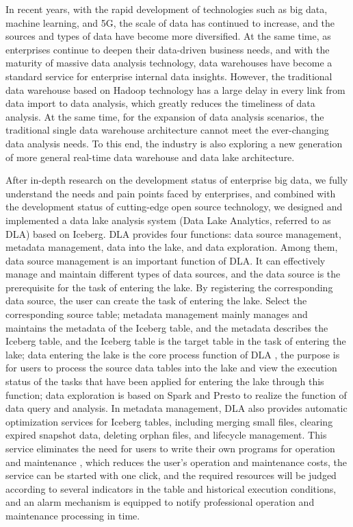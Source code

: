 \begin{abstract*}

In recent years, with the rapid development of technologies such as big data,
machine learning, and 5G, the scale of data has continued to increase, and the
sources and types of data have become more diversified. At the same time, as
enterprises continue to deepen their data-driven business needs, and with the
maturity of massive data analysis technology, data warehouses have become a
standard service for enterprise internal data insights. However, the traditional
data warehouse based on Hadoop technology has a large delay in every link from data
import to data analysis, which greatly reduces the timeliness of data analysis.
At the same time, for the expansion of data analysis scenarios, the traditional
single data warehouse architecture cannot meet the ever-changing data analysis
needs. To this end, the industry is also exploring a new generation of more general
real-time data warehouse and data lake architecture.

After in-depth research on the development status of enterprise big data, we fully
understand the needs and pain points faced by enterprises, and combined with the
development status of cutting-edge open source technology, we designed and implemented
a data lake analysis system (Data Lake Analytics, referred to as DLA) based on Iceberg.
DLA provides four functions: data source management, metadata management, data into the
lake, and data exploration. Among them, data source management is an important function
of DLA. It can effectively manage and maintain different types of data sources, and the
data source is the prerequisite for the task of entering the lake. By registering the
corresponding data source, the user can create the task of entering the lake. Select
the corresponding source table; metadata management mainly manages and maintains the
metadata of the Iceberg table, and the metadata describes the Iceberg table, and the
Iceberg table is the target table in the task of entering the lake; data entering the
lake is the core process function of DLA , the purpose is for users to process the
source data tables into the lake and view the execution status of the tasks that have
been applied for entering the lake through this function; data exploration is based on
Spark and Presto to realize the function of data query and analysis. In metadata management,
DLA also provides automatic optimization services for Iceberg tables, including merging
small files, clearing expired snapshot data, deleting orphan files, and lifecycle management.
This service eliminates the need for users to write their own programs for operation and
maintenance , which reduces the user's operation and maintenance costs, the service can be
started with one click, and the required resources will be judged according to several
indicators in the table and historical execution conditions, and an alarm mechanism is
equipped to notify professional operation and maintenance processing in time.


\end{abstract*}
